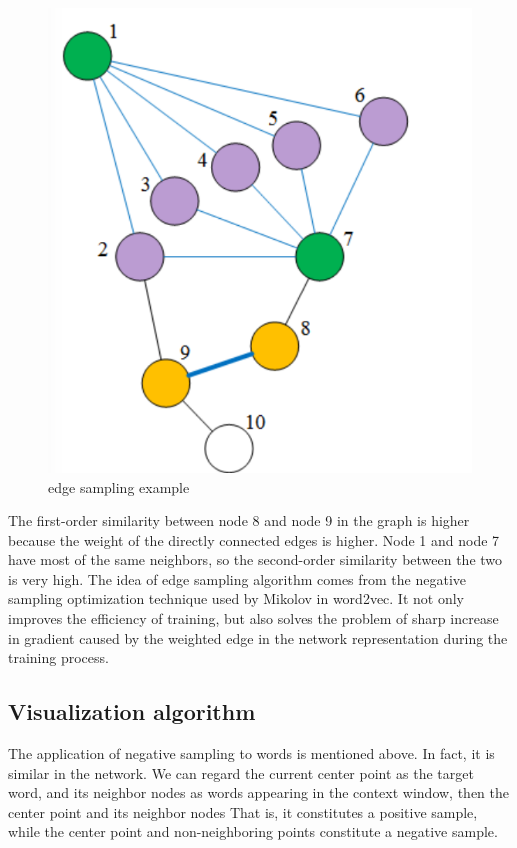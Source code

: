 \begin{figure}[ht]

\centering
\includegraphics[scale=0.85]{images/image_largevis_line_1.PNG}
\caption{edge sampling example}
\label{fig:label}
\end{figure}

\noindent The first-order similarity between node 8 and node 9 in the graph is higher because the weight of the directly connected edges is higher. Node 1 and node 7 have most of the same neighbors, so the second-order similarity between the two is very high. The idea of edge sampling algorithm comes from the negative sampling optimization technique used by Mikolov in word2vec. It not only improves the efficiency of training, but also solves the problem of sharp increase in gradient caused by the weighted edge in the network representation during the training process.\\

\subsection{Visualization algorithm}

\noindent The application of negative sampling to words is mentioned above. In fact, it is similar in the network. We can regard the current center point as the target word, and its neighbor nodes as words appearing in the context window, then the center point and its neighbor nodes That is, it constitutes a positive sample, while the center point and non-neighboring points constitute a negative sample.

